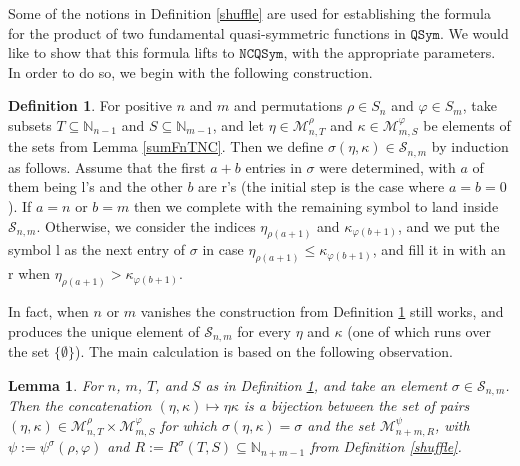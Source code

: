 \documentclass{article}
\newtheorem{lem}[thm]{Lemma}
\theoremstyle{definition}
\newtheorem{defn}[thm]{Definition}
\begin{document}
Some of the notions in Definition \ref{shuffle} are used for establishing the formula for the product of two fundamental quasi-symmetric functions in $\mathtt{QSym}$. We would like to show that this formula lifts to $\mathtt{NCQSym}$, with the appropriate parameters. In order to do so, we begin with the following construction.
\begin{defn}
For positive $n$ and $m$ and permutations $\rho \in S_{n}$ and $\varphi \in S_{m}$, take subsets $T\subseteq\mathbb{N}_{n-1}$ and $S\subseteq\mathbb{N}_{m-1}$, and let $\eta\in\mathcal{M}_{n,T}^{\rho}$ and $\kappa\in\mathcal{M}_{m,S}^{\varphi}$ be elements of the sets from Lemma \ref{sumFnTNC}. Then we define $\sigma(\eta,\kappa)\in\mathcal{S}_{n,m}$ by induction as follows. Assume that the first $a+b$ entries in $\sigma$ were determined, with $a$ of them being l's and the other $b$ are r's (the initial step is the case where $a=b=0$). If $a=n$ or $b=m$ then we complete with the remaining symbol to land inside $\mathcal{S}_{n,m}$. Otherwise, we consider the indices $\eta_{\rho(a+1)}$ and $\kappa_{\varphi(b+1)}$, and we put the symbol l as the next entry of $\sigma$ in case $\eta_{\rho(a+1)}\leq\kappa_{\varphi(b+1)}$, and fill it in with an r when $\eta_{\rho(a+1)}>\kappa_{\varphi(b+1)}$. \label{defsigma}
\end{defn}
In fact, when $n$ or $m$ vanishes the construction from Definition \ref{defsigma} still works, and produces the unique element of $\mathcal{S}_{n,m}$ for every $\eta$ and $\kappa$ (one of which runs over the set $\{\emptyset\}$). The main calculation is based on the following observation.
\begin{lem}
For $n$, $m$, $T$, and $S$ as in Definition \ref{defsigma}, and take an element $\sigma\in\mathcal{S}_{n,m}$. Then the concatenation $(\eta,\kappa)\mapsto\eta\kappa$ is a bijection between the set of pairs $(\eta,\kappa)\in\mathcal{M}_{n,T}^{\rho}\times\mathcal{M}_{m,S}^{\varphi}$ for which $\sigma(\eta,\kappa)=\sigma$ and the set $\mathcal{M}_{n+m,R}^{\psi}$, with $\psi:=\psi^{\sigma}(\rho,\varphi)$ and $R:=R^{\sigma}(T,S)\subseteq\mathbb{N}_{n+m-1}$ from Definition \ref{shuffle}. \label{matchsigma}
\end{lem}
\end{document}
